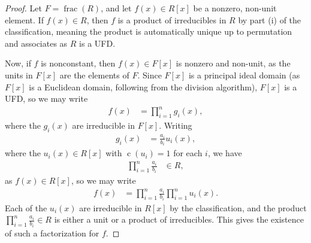 \documentclass[10pt]{mypackage}
\begin{document}
\begin{proof}
  Let $F = \operatorname{frac}(R)$, and let $f(x)\in R[x]$ be a nonzero, non-unit element. If $f(x)\in R$, then $f$ is a product of irreducibles in $R$ by part (i) of the classification, meaning the product is automatically unique up to permutation and associates as $R$ is a UFD.%

  Now, if $f$ is nonconstant, then $f(x)\in F[x]$ is nonzero and non-unit, as the units in $F[x]$ are the elements of $F$. Since $F[x]$ is a principal ideal domain (as $F[x]$ is a Euclidean domain, following from the division algorithm), $F[x]$ is a UFD, so we may write
  \begin{align*}
    f(x) &= \prod_{i=1}^{n}g_i(x),
  \end{align*}
  where the $g_i(x)$ are irreducible in $F[x]$. Writing
  \begin{align*}
    g_i(x) &= \frac{a_i}{b_i} u_i(x),
  \end{align*}
  where the $u_i(x)\in R[x]$ with $\operatorname{c}\left( u_i \right) = 1$ for each $i$, we have
  \begin{align*}
    \prod_{i=1}^{n}\frac{a_i}{b_i} &\in R,
  \end{align*}
  as $f(x)\in R[x]$, so we may write
  \begin{align*}
    f(x) &= \prod_{i=1}^{n} \frac{a_i}{b_i} \prod_{i=1}^{n}u_i(x).
  \end{align*}
  Each of the $u_i(x)$ are irreducible in $R[x]$ by the classification, and the product $\prod_{i=1}^{n}\frac{a_i}{b_i}\in R$ is either a unit or a product of irreducibles. This gives the existence of such a factorization for $f$.%


\end{proof}
\end{document}
